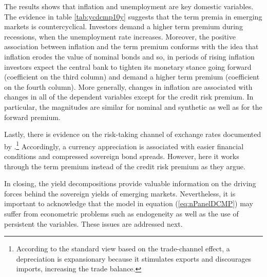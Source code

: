 {%

The results shows that inflation and unemployment are key domestic variables.
The evidence in table \ref{tab:ycdcmp10y} suggests that the term premia in emerging markets is countercyclical.
Investors demand a higher term premium during recessions, when the unemployment rate increases. 
Moreover, the positive association between inflation and the term premium conforms with the idea that inflation erodes the value of nominal bonds and so, in periods of rising inflation investors expect the central bank to tighten its monetary stance going forward (coefficient on the third column) and demand a higher term premium (coefficient on the fourth column). 
More generally, changes in inflation are associated with changes in all of the dependent variables except for the credit risk premium. 
In particular, the magnitudes are similar for nominal and synthetic as well as for the forward premium.

Lastly, there is evidence on the risk-taking channel of exchange rates documented by \cite{HofmannShimShin:2019}.\footnote{ According to the standard view based on the trade-channel effect, a depreciation is expansionary because it stimulates exports and discourages imports, increasing the trade balance.} 
Accordingly, a currency appreciation is associated with easier financial conditions and compressed sovereign bond spreads.
However, here it works through the term premium instead of the credit risk premium as they argue.

In closing, the yield decompositions provide valuable information on the driving forces behind the sovereign yields of emerging markets.
Nevertheless, it is important to acknowledge that the model in equation (\ref{eq:nPanelDCMP}) may suffer from econometric problems such as endogeneity as well as the use of persistent the variables.
These issues are addressed next.

}
